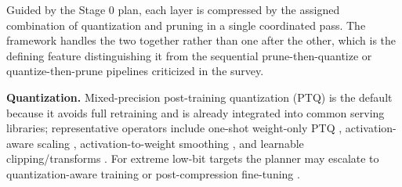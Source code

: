 Guided by the Stage 0 plan, each layer is compressed by the assigned combination of quantization and pruning in a single coordinated pass. The framework handles the two together rather than one after the other, which is the defining feature distinguishing it from the sequential prune-then-quantize or quantize-then-prune pipelines criticized in the survey.

\textbf{Quantization.} Mixed-precision post-training quantization (PTQ) is the default because it avoids full retraining and is already integrated into common serving libraries; representative operators include one-shot weight-only PTQ \cite{frantar2023gptq}, activation-aware scaling \cite{lin2024awq}, activation-to-weight smoothing \cite{xiao2023smoothquant}, and learnable clipping/transforms \cite{shao2024omniquant}. For extreme low-bit targets the planner may escalate to quantization-aware training \cite{chen2025efficientqat} or post-compression fine-tuning \cite{malinovskii2024pvtuning}.

